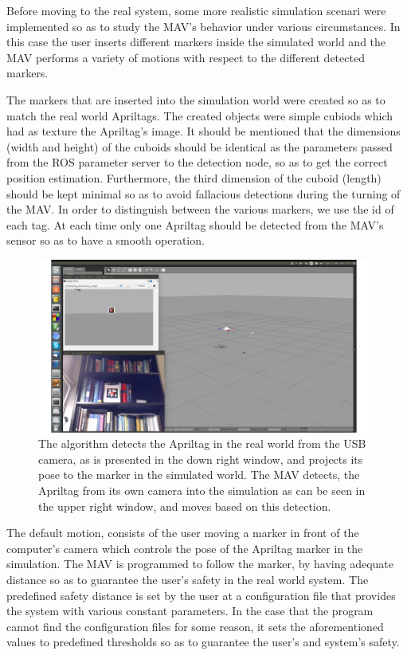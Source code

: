Before moving to the real system, some more realistic simulation scenari were implemented so as to study the MAV's behavior under various circumstances. In this case the user inserts different markers inside the simulated world and the MAV performs a variety of motions with respect to the different detected markers.

The markers that are inserted into the simulation world were created so as to match the real world Apriltags. The created objects were simple cubiods which had as texture the Apriltag's image. It should be mentioned that the dimensions (width and height) of the cuboids should be identical as the parameters passed from the ROS parameter server to the detection node, so as to get the correct position estimation. Furthermore, the third dimension of the cuboid (length) should be kept minimal so as to avoid fallacious detections during the turning of the MAV. In order to distinguish between the various markers, we use the id of each tag. At each time only one Apriltag should be detected from the MAV's sensor so as to have a smooth operation.

\begin{figure}
   \centering
   \includegraphics[width=0.98\textwidth]{images/sim_atag_mavdet_win.pdf}
   \caption{The algorithm detects the Apriltag in the real world from the USB camera, as is presented in the down right window, and projects its pose to the marker in the simulated world. The MAV detects, the Apriltag from its own camera into the simulation as can be seen in the upper right window, and moves based on this detection.}
   \label{pics:apriltags_firefly_simulation_screen}
\end{figure}

The default motion, consists of the user moving a marker in front of the computer's camera which controls the pose of the Apriltag marker in the simulation. The MAV is programmed to follow the marker, by having adequate distance so as to guarantee the user's safety in the real world system. The predefined safety distance is set by the user at a configuration file that provides the system with various constant parameters. In the case that the program cannot find the configuration files for some reason, it sets the aforementioned values to predefined thresholds so as to guarantee the user's and system's safety. 

